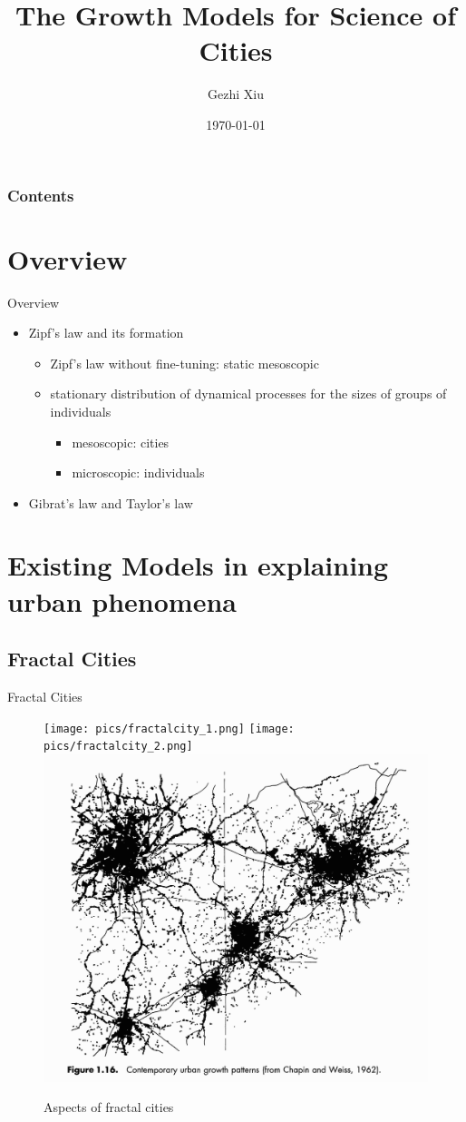 \documentclass{beamer}
\title[Growth Models]{The Growth Models for Science of Cities}
\author[G. Xiu]{Gezhi Xiu} %
\institute[IRSGIS PKU]{Complexity Research Group,\\Peking University}
\date[\today]{\today}
\begin{document}
\maketitle
\begin{frame} \frametitle{Contents}
\tableofcontents
\end{frame}
\section{Overview}
\begin{frame}{Overview}
  \begin{itemize}
    \item Zipf's law and its formation
    \begin{itemize}
      \item Zipf's law without fine-tuning: static mesoscopic
      \item stationary distribution of dynamical processes for the sizes of groups of individuals
      \begin{itemize}
        \item mesoscopic: cities
        \item microscopic: individuals
      \end{itemize}
    \end{itemize}
    \item Gibrat's law and Taylor's law
  \end{itemize}
\end{frame}

\section{Existing Models in explaining urban phenomena}

\subsection{Fractal Cities}

\begin{frame}{Fractal Cities}

  \begin{figure}
    \texttt{[image: pics/fractalcity\_1.png]}
    \texttt{[image: pics/fractalcity\_2.png]}
    \includegraphics[width = 0.3\linewidth]{pics/fractalcity_3.png}
    \caption{Aspects of fractal cities}
  \end{figure}
\end{frame}
\end{document}
